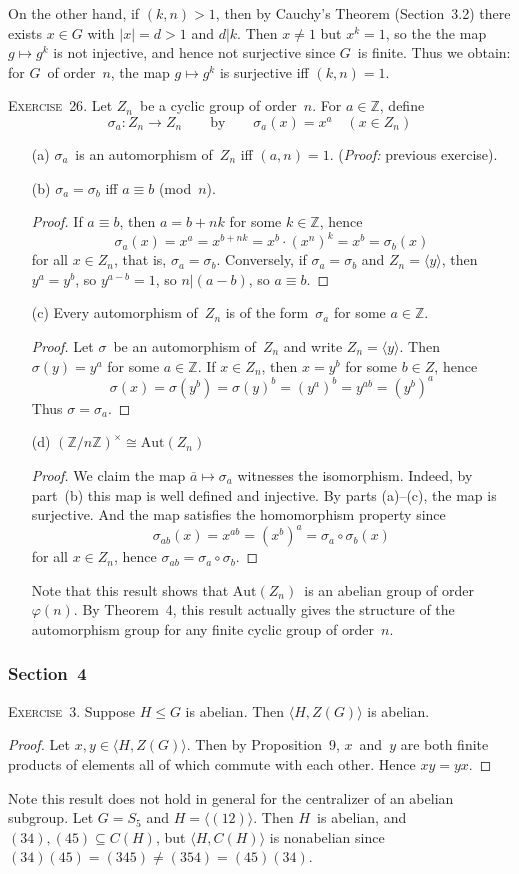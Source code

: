 \documentclass[letterpaper]{article}
\newcommand{\exercise}[1]{\goodbreak\noindent\textsc{Exercise~{#1}.}}
\newcommand{\Z}{\mathbb{Z}}
\newcommand{\iso}{\cong}
\newcommand{\subgroup}{\le}
\newcommand{\aut}{\mathrm{Aut}}
\newcommand{\res}[1]{\overline{#1}}
\newcommand{\ord}[1]{|{#1}|}
\newcommand{\gen}[1]{\langle{#1}\rangle}
\begin{document}
On the other hand, if $(k,n)>1$, then by Cauchy's Theorem (Section~3.2) there exists $x\in G$ with $\ord{x}=d>1$ and $d|k$. Then $x\ne 1$ but $x^k=1$, so the the map $g\mapsto g^k$ is not injective, and hence not surjective since $G$~is finite. Thus we obtain: for $G$~of order~$n$, the map $g\mapsto g^k$ is surjective iff $(k,n)=1$.

\bigskip
\exercise{26}
Let $Z_n$~be a cyclic group of order~$n$. For $a\in\Z$, define
$$\sigma_a:Z_n\to Z_n\qquad\text{by}\qquad\sigma_a(x)=x^a\quad(x\in Z_n)$$
\begin{enumerate}[itemsep=0pt]
\item[(a)] $\sigma_a$~is an automorphism of~$Z_n$ iff $(a,n)=1$. (\emph{Proof:} previous exercise).
\item[(b)] $\sigma_a=\sigma_b$ iff $a\equiv b$ (mod~$n$).
\begin{proof}
If $a\equiv b$, then $a=b+nk$ for some $k\in\Z$, hence
$$\sigma_a(x)=x^a=x^{b+nk}=x^b\cdot(x^n)^k=x^b=\sigma_b(x)$$
for all $x\in Z_n$, that is, $\sigma_a=\sigma_b$. Conversely, if $\sigma_a=\sigma_b$ and $Z_n=\gen{y}$, then $y^a=y^b$, so $y^{a-b}=1$, so $n|(a-b)$, so $a\equiv b$.
\end{proof}
\item[(c)] Every automorphism of~$Z_n$ is of the form~$\sigma_a$ for some $a\in\Z$.
\begin{proof}
Let $\sigma$~be an automorphism of~$Z_n$ and write $Z_n=\gen{y}$. Then $\sigma(y)=y^a$ for some $a\in\Z$. If $x\in Z_n$, then $x=y^b$ for some $b\in Z$, hence
$$\sigma(x)=\sigma(y^b)=\sigma(y)^b=(y^a)^b=y^{ab}=(y^b)^a$$
Thus $\sigma=\sigma_a$.
\end{proof}
\item[(d)] $(\Z/n\Z)^{\times}\iso\aut(Z_n)$
\begin{proof}
We claim the map $\res{a}\mapsto\sigma_a$ witnesses the isomorphism. Indeed, by part~(b) this map is well defined and injective. By parts (a)--(c), the map is surjective. And the map satisfies the homomorphism property since
$$\sigma_{ab}(x)=x^{ab}=(x^b)^a=\sigma_a\circ\sigma_b(x)$$
for all $x\in Z_n$, hence $\sigma_{ab}=\sigma_a\circ\sigma_b$.
\end{proof}
Note that this result shows that $\aut(Z_n)$~is an abelian group of order~$\varphi(n)$. By Theorem~4, this result actually gives the structure of the automorphism group for any finite cyclic group of order~$n$.
\end{enumerate}

\subsubsection*{Section~4}
\exercise{3}
Suppose $H\subgroup G$ is abelian. Then $\gen{H,Z(G)}$ is abelian.
\begin{proof}
Let $x,y\in\gen{H,Z(G)}$. Then by Proposition~9, $x$~and~$y$ are both finite products of elements all of which commute with each other. Hence $xy=yx$.
\end{proof}
\noindent Note this result does not hold in general for the centralizer of an abelian subgroup. Let $G=S_5$ and $H=\gen{(12)}$. Then $H$~is abelian, and ${(34),(45)}\subseteq C(H)$, but $\gen{H,C(H)}$ is nonabelian since $(34)(45)=(345)\ne(354)=(45)(34)$.
\end{document}
